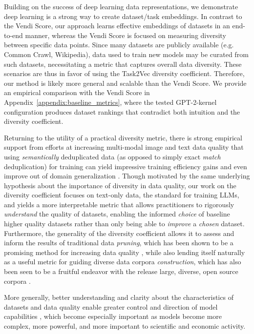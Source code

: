 Building on the success of deep learning data representations, we demonstrate deep learning is a strong way to create dataset/task embeddings.
In contrast to the Vendi Score, our approach learns effective embeddings of datasets in an end-to-end manner, whereas the Vendi Score is focused on measuring diversity between specific data points. 
Since many datasets are publicly available (e.g. Common Crawl, Wikipedia), data used to train new models may be curated from such datasets, necessitating a metric that captures overall data diversity.
These scenarios are thus in favor of using the Task2Vec diversity coefficient. 
Therefore, our method is likely more general and scalable than the Vendi Score. 
We provide an empirical comparison with the Vendi Score in Appendix~\ref{appendix:baseline_metrics}, where the tested GPT-2-kernel configuration produces dataset rankings that contradict both intuition and the diversity coefficient.

Returning to the utility of a practical diversity metric, there is strong empirical support from efforts at increasing multi-modal image and text data quality that using \textit{semantically} deduplicated data (as opposed to simply exact \textit{match} deduplication) for training can yield impressive training efficiency gains and even improve out of domain generalization \citep{abbas2023semdedup, abbas2024effective}. Though motivated by the same underlying hypothesis about the importance of diversity in data quality, our work on the diversity coefficient focuses on text-only data, the standard for training LLMs, and yields a more interpretable metric that allows practitioners to rigorously \textit{understand} the quality of datasets, enabling the informed \textit{choice} of baseline higher quality datasets rather than only being able to \textit{improve} a \textit{chosen} dataset. Furthermore, the generality of the diversity coefficient allows it to assess and inform the results of traditional data \textit{pruning}, which has been shown to be a promising method for increasing data quality \citep{sorscher2023neural}, while also lending itself naturally as a useful metric for guiding diverse data corpora \textit{construction}, which has also been seen to be a fruitful endeavor with the release large, diverse, open source corpora \citep{thepile}.

More generally, better understanding and clarity about the characteristics of datasets and data quality enable greater control and direction of model capabilities \citep{mitchell2023measuring}, which become especially important as models become more complex, more powerful, and more important to scientific and economic activity. 

